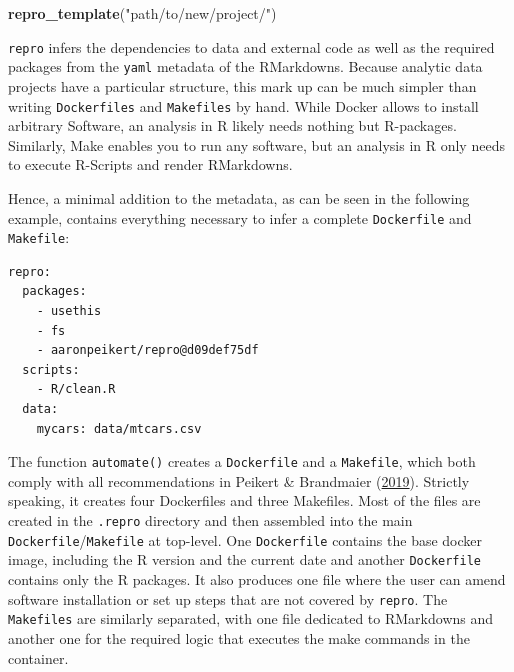 \documentclass[12pt,a4paper,]{article}
\newenvironment{Shaded}{\begin{snugshade}}{\end{snugshade}}
\newcommand{\KeywordTok}[1]{\textcolor[rgb]{0.13,0.29,0.53}{\textbf{#1}}}
\newcommand{\NormalTok}[1]{#1}
\newcommand{\StringTok}[1]{\textcolor[rgb]{0.31,0.60,0.02}{#1}}
\begin{document}
\begin{Shaded}
\begin{Highlighting}[]
\KeywordTok{repro_template}\NormalTok{(}\StringTok{"path/to/new/project/"}\NormalTok{)}
\end{Highlighting}
\end{Shaded}

\texttt{repro} infers the dependencies to data and external code as well as the required packages from the \texttt{yaml} metadata of the RMarkdowns.
Because analytic data projects have a particular structure, this mark up can be much simpler than writing \texttt{Dockerfiles} and \texttt{Makefiles} by hand.
While Docker allows to install arbitrary Software, an analysis in R likely needs nothing but R-packages. Similarly, Make enables you to run any software, but an analysis in R only needs to execute R-Scripts and render RMarkdowns.

Hence, a minimal addition to the metadata, as can be seen in the following example, contains everything necessary to infer a complete \texttt{Dockerfile} and \texttt{Makefile}:

\begin{verbatim}
repro:
  packages:
    - usethis
    - fs
    - aaronpeikert/repro@d09def75df
  scripts:
    - R/clean.R
  data:
    mycars: data/mtcars.csv
\end{verbatim}

The function \texttt{automate()} creates a \texttt{Dockerfile} and a \texttt{Makefile}, which both comply with all recommendations in Peikert \& Brandmaier (\protect\hyperlink{ref-peikertReproducibleDataAnalysis2019}{2019}).
Strictly speaking, it creates four Dockerfiles and three Makefiles.
Most of the files are created in the \texttt{.repro} directory and then assembled into the main \texttt{Dockerfile}/\texttt{Makefile} at top-level.
One \texttt{Dockerfile} contains the base docker image, including the R version and the current date and another \texttt{Dockerfile} contains only the R packages.
It also produces one file where the user can amend software installation or set up steps that are not covered by \texttt{repro}.
The \texttt{Makefiles} are similarly separated, with one file dedicated to RMarkdowns and another one for the required logic that executes the make commands in the container.
\end{document}
